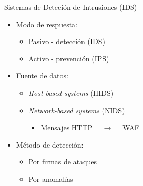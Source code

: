 \begin{frame}
    \begin{exampleblock}{Sistemas de Deteción de Intrusiones (IDS)}
        \begin{itemize}
            \item<2->
            Modo de respuesta:

            \begin{itemize}[<.->]
                \item
                Pasivo - detección (IDS)

                \item
                Activo - prevención (IPS)
            \end{itemize}

            \item<3->
            Fuente de datos:

            \begin{itemize}[<.->]
                \item
                \textit{Host-based systems} (HIDS)

                \item
                \textit{Network-based systems} (NIDS)

                \begin{itemize}
                    \item
                    Mensajes HTTP $\quad \rightarrow \quad$ WAF
                \end{itemize}
            \end{itemize}

            \item<4->
            Método de detección:

            \begin{itemize}[<.->]
                \item
                Por firmas de ataques

                \item
                Por anomalías
            \end{itemize}
        \end{itemize}
    \end{exampleblock}
\end{frame}

